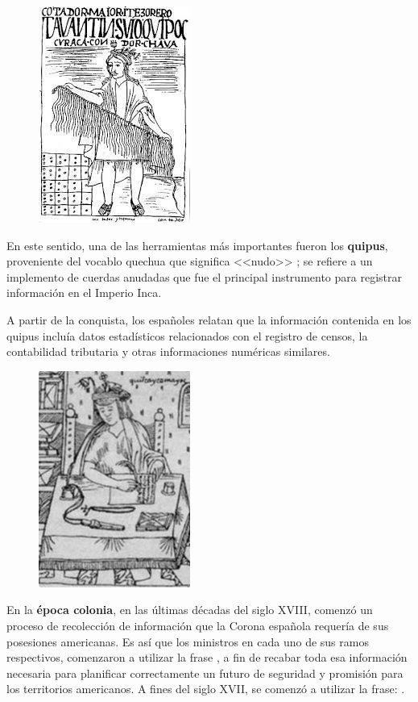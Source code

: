 \documentclass[a5paper,doc,10pt,noapacite]{apa6}
\begin{document}
{{\begin{figure} %
    \centering
    \includegraphics[scale=0.35]{Graficos/fig5_GC.jpg}
\end{figure}

En este sentido, una de las herramientas más importantes fueron los \textbf{quipus}, proveniente del vocablo quechua que significa <<nudo>> ; se refiere a un implemento de cuerdas anudadas que fue el principal instrumento para registrar información en el Imperio Inca.

A partir de la conquista, los españoles relatan que la información contenida en los quipus incluía datos estadísticos relacionados con el registro de censos, la contabilidad tributaria y otras informaciones numéricas similares. 

\begin{figure} %
    \centering
    \includegraphics[scale=0.35]{Graficos/fig3_GC.jpg}
    \vspace{-2em}
\end{figure}

En la \textbf{época colonia}, en las últimas décadas del siglo XVIII, comenzó un proceso de recolección de información que la Corona española requería de sus posesiones americanas. Es así que los ministros en cada uno de sus ramos respectivos, comenzaron a utilizar la frase , a fin de recabar toda esa información necesaria para planificar correctamente un futuro de seguridad y promisión para los territorios americanos. A fines del siglo XVII, se comenzó a utilizar la frase: .

}}
\end{document}

